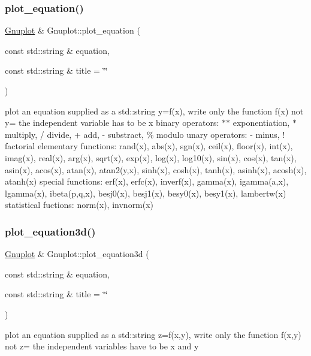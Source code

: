 \subsubsection{\texorpdfstring{plot\+\_\+equation()}{plot\_equation()}}
{\footnotesize\ttfamily \hyperlink{class_gnuplot}{Gnuplot} \& Gnuplot\+::plot\+\_\+equation (\begin{DoxyParamCaption}\item[{const std\+::string \&}]{equation,  }\item[{const std\+::string \&}]{title = {\ttfamily \char`\"{}\char`\"{}} }\end{DoxyParamCaption})}

plot an equation supplied as a std\+::string y=f(x), write only the function f(x) not y= the independent variable has to be x binary operators\+: $\ast$$\ast$ exponentiation, $\ast$ multiply, / divide, + add, -\/ substract, \% modulo unary operators\+: -\/ minus, ! factorial elementary functions\+: rand(x), abs(x), sgn(x), ceil(x), floor(x), int(x), imag(x), real(x), arg(x), sqrt(x), exp(x), log(x), log10(x), sin(x), cos(x), tan(x), asin(x), acos(x), atan(x), atan2(y,x), sinh(x), cosh(x), tanh(x), asinh(x), acosh(x), atanh(x) special functions\+: erf(x), erfc(x), inverf(x), gamma(x), igamma(a,x), lgamma(x), ibeta(p,q,x), besj0(x), besj1(x), besy0(x), besy1(x), lambertw(x) statistical fuctions\+: norm(x), invnorm(x) \mbox{\label{class_gnuplot_a79aed3a6927f7d1d3497cba441e8a943}} 
\subsubsection{\texorpdfstring{plot\+\_\+equation3d()}{plot\_equation3d()}}
{\footnotesize\ttfamily \hyperlink{class_gnuplot}{Gnuplot} \& Gnuplot\+::plot\+\_\+equation3d (\begin{DoxyParamCaption}\item[{const std\+::string \&}]{equation,  }\item[{const std\+::string \&}]{title = {\ttfamily \char`\"{}\char`\"{}} }\end{DoxyParamCaption})}

plot an equation supplied as a std\+::string z=f(x,y), write only the function f(x,y) not z= the independent variables have to be x and y \mbox{\label{class_gnuplot_aae22c0470a6fbbc1f5e84dec8d023381}} 
